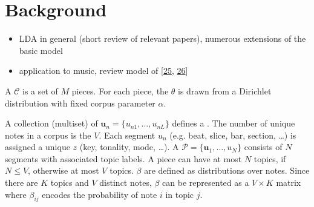 \documentclass[letterpaper,10pt,english]{sphinxmanual}
\begin{document}
\section{Background}
\label{\detokenize{topic_modeling:background}}\begin{itemize}
\item {} 
\sphinxAtStartPar
LDA in general (short review of relevant papers), numerous
extensions of the basic model

\item {} 
\sphinxAtStartPar
application to music, review model of
{[}\hyperlink{cite.8_bibliography:id63}{25}, \hyperlink{cite.8_bibliography:id64}{26}{]}

\end{itemize}

\sphinxAtStartPar
A  \(\mathcal C\) is a set of \(M\) pieces. For each
piece, the  \(\theta\) is drawn from a
Dirichlet distribution with fixed corpus parameter \(\alpha.\)

\sphinxAtStartPar
A collection (multiset) of 
\(\boldsymbol{u}_n = \{u_{n1},\ldots,u_{nL}\}\) defines a
. The number of unique notes in a corpus is the  \(V\). Each segment \({u}_n\) (e.g. beat, slice, bar,
section, …) is assigned a unique  \(z\) (key,
tonality, mode, …). A 
\(\mathcal P = \{\boldsymbol{u}_1, \ldots, u_N\}\) consists of
\(N\) segments with associated topic labels. A piece can have at
most \(N\) topics, if \(N\leq V\), otherwise at most \(V\)
topics.  \(\beta\) are defined as distributions over
notes.
Since there are \(K\) topics and \(V\) distinct notes,
\(\beta\) can be represented as a \(V \times K\) matrix where
\(\beta_{ij}\) encodes the probability of note \(i\) in topic
\(j\).
\end{document}
